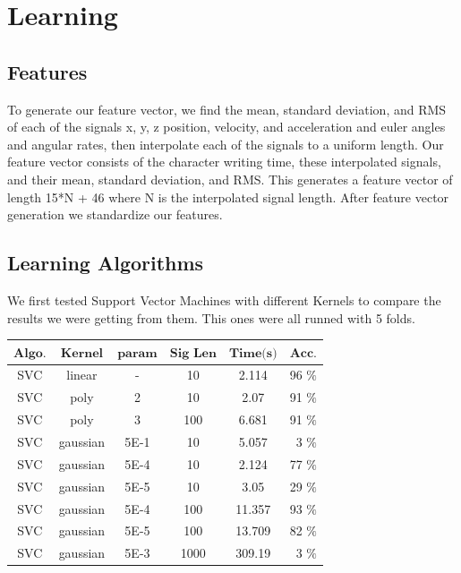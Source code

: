 \documentclass{article}
\begin{document}
\newpage
\section{Learning}

\subsection{Features}
To generate our feature vector, we find the mean, standard deviation, and RMS of each of the signals x, y, z position, velocity, and acceleration and euler angles and angular rates, then interpolate each of the signals to a uniform length.  Our feature vector consists of the character writing time, these interpolated signals, and their mean, standard deviation, and RMS.  This generates a feature vector of length 15*N + 46 where N is the interpolated signal length.  After feature vector generation we standardize our features.  
 
\subsection{Learning Algorithms}
We first tested Support Vector Machines with different Kernels to compare the results we were getting from them. This ones were all runned with 5 folds.

\begin{center}
    \begin{tabular}{ | c | c | c | c | c | r |}
    \hline
    $\textbf{Algo.}$ & $\textbf{Kernel}$  & $\textbf{param}$ & $\textbf{Sig Len}$ & $\textbf{Time(s)}$ & $\textbf{Acc.}$ \\ \hline
    SVC & linear & - & 10 & 2.114 & 96 $\%$ \\ \hline
    SVC & poly & 2 & 10 & 2.07 & 91 $\%$ \\ \hline
    SVC & poly & 3 & 100 & 6.681 & 91 $\%$ \\ \hline
    SVC & gaussian & 5E-1 & 10 & 5.057 & 3 $\%$ \\ \hline
    SVC & gaussian & 5E-4 & 10 & 2.124 & 77 $\%$ \\ \hline
    SVC & gaussian & 5E-5 & 10 & 3.05 & 29 $\%$ \\ \hline
    SVC & gaussian & 5E-4 & 100 & 11.357 & 93 $\%$ \\ \hline
    SVC & gaussian & 5E-5 & 100 & 13.709 & 82 $\%$ \\ \hline
    SVC & gaussian & 5E-3 & 1000 & 309.19 & 3 $\%$ \\ \hline
    
    \end{tabular}
\end{center}
\end{document}
